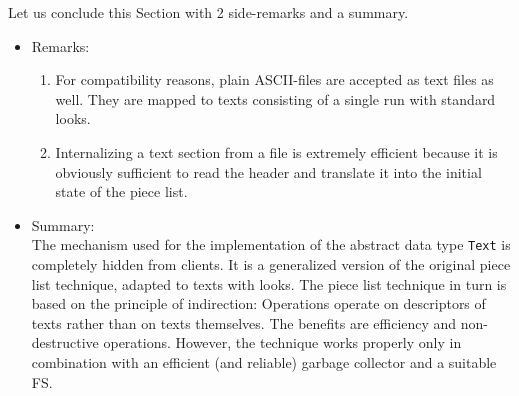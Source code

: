 Let us conclude this Section with 2 side-remarks and a summary.
\begin{itemize}
  \item Remarks:
\begin{enumerate}
  \item For compatibility reasons, plain ASCII-files are accepted as text files as well. They are mapped
    to texts consisting of a single run with standard looks.
  \item Internalizing a text section from a file is extremely efficient because it is obviously sufficient to
    read the header and translate it into the initial state of the piece list.
\end{enumerate}

  \item Summary:\\
    The mechanism used for the implementation of the abstract data type \verb|Text| is completely hidden
    from clients. It is a generalized version of the original piece list technique, adapted to texts with
    looks. The piece list technique in turn is based on the principle of indirection: Operations operate
    on descriptors of texts rather than on texts themselves. The benefits are efficiency and non-destructive
    operations. However, the technique works properly only in combination with an efficient (and reliable)
    garbage collector and a suitable FS.
\end{itemize}
